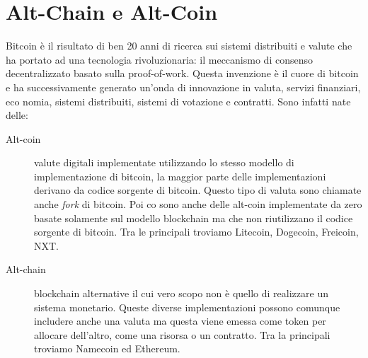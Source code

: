 \section{Alt-Chain e Alt-Coin}
Bitcoin è il risultato di ben 20 anni di ricerca sui sistemi distribuiti e valute che ha portato ad una tecnologia rivoluzionaria: il meccanismo di consenso decentralizzato basato sulla proof-of-work. Questa invenzione è il cuore di bitcoin e ha successivamente generato un'onda di innovazione in valuta, servizi finanziari, eco	nomia, sistemi distribuiti, sistemi di votazione e contratti. Sono infatti nate delle:
\begin{description}
	\item[Alt-coin] valute digitali implementate utilizzando lo stesso modello di implementazione di bitcoin, la maggior parte delle implementazioni derivano da codice sorgente di bitcoin. Questo tipo di valuta sono chiamate anche \textit{fork} di bitcoin. Poi co sono anche delle alt-coin implementate da zero basate solamente sul modello blockchain ma che non riutilizzano il codice sorgente di bitcoin. Tra le principali troviamo Litecoin, Dogecoin, Freicoin, NXT.
	\item[Alt-chain] blockchain alternative il cui vero scopo non è quello di realizzare un sistema monetario. Queste diverse implementazioni possono comunque includere anche una valuta ma questa viene emessa come token per allocare dell'altro, come una risorsa o un contratto. Tra la principali troviamo Namecoin ed Ethereum.
\end{description}